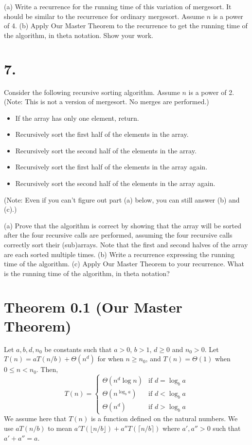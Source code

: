 \documentclass{article}
\begin{document}
(a) Write a recurrence for the running time of this variation of mergesort. It should be similar to the recurrence for ordinary mergesort. Assume $n$ is a power of 4.
(b) Apply Our Master Theorem to the recurrence to get the running time of the algorithm, in theta notation. Show your work.

\section*{7.}
Consider the following recursive sorting algorithm. Assume $n$ is a power of 2. (Note: This is not a version of mergesort. No merges are performed.)
\begin{itemize}
    \item If the array has only one element, return.
    \item Recursively sort the first half of the elements in the array.
    \item Recursively sort the second half of the elements in the array.
    \item Recursively sort the first half of the elements in the array again.
    \item Recursively sort the second half of the elements in the array again.
\end{itemize}
(Note: Even if you can’t figure out part (a) below, you can still answer (b) and (c).)

(a) Prove that the algorithm is correct by showing that the array will be sorted after the four recursive calls are performed, assuming the four recursive calls correctly sort their (sub)arrays. Note that the first and second halves of the array are each sorted multiple times.
(b) Write a recurrence expressing the running time of the algorithm.
(c) Apply Our Master Theorem to your recurrence. What is the running time of the algorithm, in theta notation?


\section*{Theorem 0.1 (Our Master Theorem)}
Let $a, b, d, n_0$ be constants such that $a > 0$, $b > 1$, $d \ge 0$ and $n_0 > 0$.
Let $T(n) = aT(n/b) + \Theta(n^d)$ for when $n \ge n_0$, and $T(n) = \Theta(1)$ when $0 \le n < n_0$. Then,
\[
T(n) = \begin{cases}
\Theta(n^d \log n) & \text{if } d = \log_b a \\
\Theta(n^{\log_b a}) & \text{if } d < \log_b a \\
\Theta(n^d) & \text{if } d > \log_b a
\end{cases}
\]
We assume here that $T(n)$ is a function defined on the natural numbers. We use $aT(n/b)$ to mean $a' T(\lfloor n/b \rfloor) + a'' T(\lceil n/b \rceil)$ where $a', a'' > 0$ such that $a' + a'' = a$.
\end{document}
